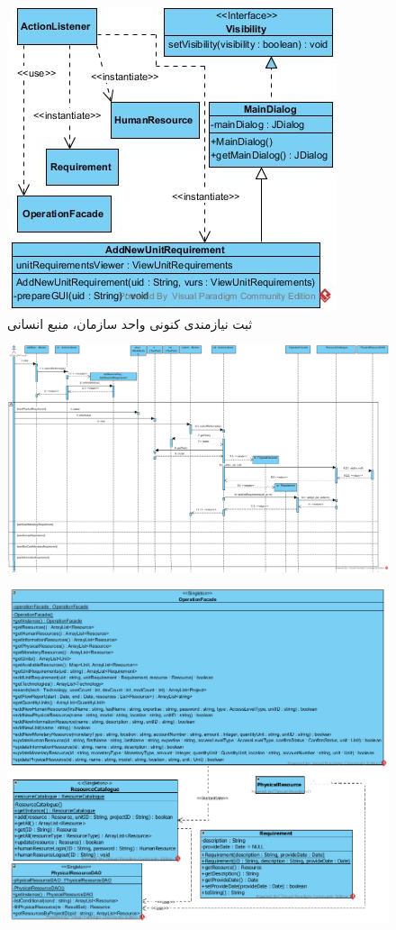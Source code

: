 \begin{landscape}
\begin{figure}[H]
	\includegraphics[scale=0.5]{img/sequence-design/AddRequirementToUnit_HUMANUI}
	\caption{ثبت نیازمندی کنونی واحد سازمان، منبع انسانی}
\end{figure}
\begin{figure}[H]
	\centering
	\includegraphics[scale=0.5]{img/sequence-design/AddRequirementToUnit_PHYSICAL}
\end{figure}
\begin{figure}[H]
	\centering
	\includegraphics[scale=0.5]{img/sequence-design/AddRequirementToUnit_PHYSICALC}

\end{figure}
\end{landscape}
